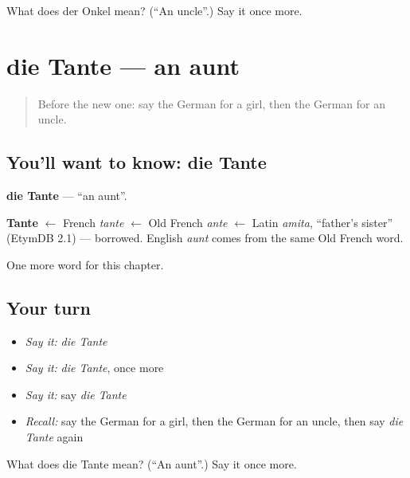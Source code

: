 \begin{tcolorbox}[breakable,colback=teal!4,colframe=teal!35!black,title={Before you move on}]
What does der Onkel mean? (\textquotedblleft{}An uncle\textquotedblright{}.) Say it once more.
\end{tcolorbox}
\section[die Tante]{die Tante — an aunt}

\label{lesson:GE-C62-tante}



\begin{quote}
Before the new one: say the German for a girl, then the German for an uncle.
\end{quote}

\subsection*{You'll want to know: die Tante}
\textbf{die Tante} — \textquotedblleft{}an aunt\textquotedblright{}.

\begin{cousinweb}
\textbf{Tante} $\leftarrow$ French \emph{tante} $\leftarrow$ Old French \emph{ante} $\leftarrow$ Latin \emph{amita}, \textquotedblleft{}father's sister\textquotedblright{} (EtymDB 2.1) — borrowed. English \emph{aunt} comes from the same Old French word.
\end{cousinweb}

\begin{grammarlens}[title={What you've built}]
One more word for this chapter.
\end{grammarlens}

\subsection*{Your turn}
\begin{itemize}
\raggedright
  \item \emph{Say it:} \emph{die Tante}
  \item \emph{Say it:} \emph{die Tante}, once more
  \item \emph{Say it:} say \emph{die Tante}
  \item \emph{Recall:} say the German for a girl, then the German for an uncle, then say \emph{die Tante} again
\end{itemize}

\begin{tcolorbox}[breakable,colback=teal!4,colframe=teal!35!black,title={Before you move on}]
What does die Tante mean? (\textquotedblleft{}An aunt\textquotedblright{}.) Say it once more.
\end{tcolorbox}
